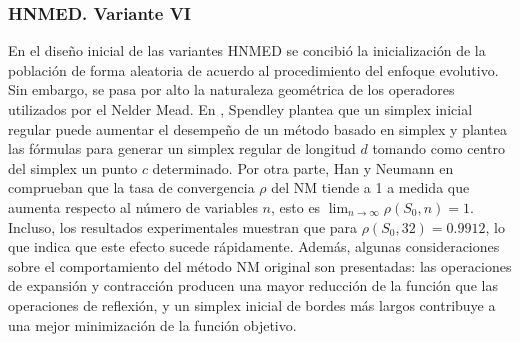 \subsubsection{HNMED. Variante VI}
En el diseño inicial de las variantes HNMED se concibió la inicialización de la población de forma aleatoria de acuerdo al procedimiento del enfoque evolutivo. Sin embargo, se pasa por alto la naturaleza geométrica de los operadores utilizados por el Nelder Mead. En \cite{spendley_sequential_1962}, Spendley plantea que un simplex inicial regular puede aumentar el desempeño de un método basado en simplex y plantea las fórmulas para generar un simplex regular de longitud $d$ tomando como centro del simplex un punto $c$ determinado. Por otra parte, Han y Neumann en \cite{han_effect_2006} comprueban que la tasa de convergencia $\rho$ del NM tiende a 1 a medida que aumenta respecto al número de variables $n$, esto es $ \lim_{n\to\infty}\rho(S_0,n)=1$. Incluso, los resultados experimentales muestran que para $\rho(S_0,32)=0.9912$, lo que indica que este efecto sucede rápidamente. Además, algunas consideraciones sobre el comportamiento del método NM original son presentadas: las operaciones de expansión y contracción producen una mayor reducción de la función que las operaciones de reflexión, y un simplex inicial de bordes más largos contribuye a una mejor minimización de la función objetivo. 

